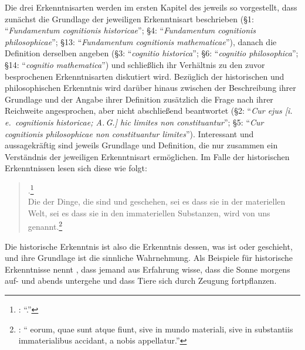Die drei Erkenntnisarten werden im ersten Kapitel des  jeweils so vorgestellt, dass zunächst
die Grundlage der jeweiligen Erkenntnisart beschrieben (\S 1:
\enquote{\emph{Fundamentum cognitionis historicae}}; \S 4:
\enquote{\emph{Fundamentum cognitionis philosophicae}}; \S 13: \enquote{\emph{Fundamentum
cognitionis mathematicae}}), danach die Definition derselben angeben (\S 3:
\enquote{\emph{cognitio historica}}; \S 6: \enquote{\emph{cognitio philosophica}}; \S 14:
\enquote{\emph{cognitio mathematica}}) und schließlich ihr Verhältnis zu den zuvor
besprochenen Erkenntnisarten diskutiert wird. Bezüglich der historischen und philosophischen
Erkenntnis wird darüber hinaus zwischen der Beschreibung ihrer Grundlage und der
Angabe ihrer Definition zusätzlich die Frage nach ihrer Reichweite angesprochen,
aber nicht abschließend beantwortet (\S 2: \enquote{\emph{Cur ejus [i.\,e.~cognitionis
historicae; A.\,G.] hic limites non constituantur}}; \S 5: \enquote{\emph{Cur cognitionis
philosophicae non constituantur limites}}). Interessant und aussagekräftig sind
jeweils Grundlage und Definition, die nur zusammen ein Verständnis der
jeweiligen Erkenntnisart ermöglichen. Im Falle der historischen Erkenntnissen
lesen sich diese wie folgt:
\begin{quote}
  .\footnote{\Cite[][\S~1]{Wolff:Discursuspraeliminarisdephilosophiaingenere1996}:
  \enquote{.}}\\
  Die  der Dinge, die sind und geschehen, sei es dass sie in der
  materiellen Welt, sei es dass sie in den immateriellen Substanzen, wird von
  uns 
  genannt.\footnote{\Cite[][\S~3]{Wolff:Discursuspraeliminarisdephilosophiaingenere1996}:
  \enquote{ eorum, quae sunt atque fiunt, sive in mundo materiali,
  sive in substantiis immaterialibus accidant,  a nobis appellatur.}}
\end{quote}
Die historische Erkenntnis ist also die Erkenntnis dessen, was ist oder
geschieht, und ihre Grundlage ist die sinnliche Wahrnehmung. Als Beispiele für
historische Erkenntnisse nennt
, dass jemand
aus Erfahrung wisse, dass die Sonne morgens auf- und abends untergehe und
dass Tiere sich durch Zeugung fortpflanzen.

